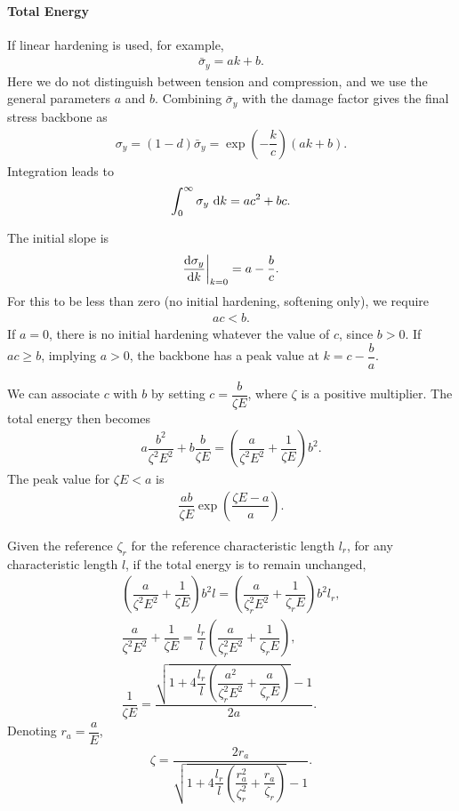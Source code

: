 \paragraph{Total Energy}
If linear hardening is used, for example,
\begin{gather}
\bar{\sigma}_y=ak+b.
\end{gather}
Here we do not distinguish between tension and compression, and we use the general parameters $a$ and $b$.
Combining $\bar{\sigma}_y$ with the damage factor gives the final stress backbone as
\begin{gather}
\sigma_y=\left(1-d\right)\bar{\sigma}_y=\exp\left(-\dfrac{k}{c}\right)\left(ak+b\right).
\end{gather}
Integration leads to
\begin{gather}
\int_{0}^{\infty}\sigma_y~\mathrm{d}k=ac^2+bc.
\end{gather}

The initial slope is
\begin{gather}
\dfrac{\mathrm{d}\sigma_y}{\mathrm{d}k}\bigg|_{k=0}=a-\dfrac{b}{c}.
\end{gather}
For this to be less than zero (no initial hardening, softening only), we require
\begin{gather}
ac<b.
\end{gather}
If $a=0$, there is no initial hardening whatever the value of $c$, since $b>0$.
If $ac\geqslant{}b$, implying $a>0$, the backbone has a peak value at $k=c-\dfrac{b}{a}$.

We can associate $c$ with $b$ by setting $c=\dfrac{b}{\zeta{}E}$, where $\zeta$ is a positive multiplier.
The total energy then becomes
\begin{gather}
a\dfrac{b^2}{\zeta^2E^2}+b\dfrac{b}{\zeta{}E}=\left(\dfrac{a}{\zeta^2E^2}+\dfrac{1}{\zeta{}E}\right)b^2.
\end{gather}
The peak value for $\zeta{}E<a$ is
\begin{gather}
\dfrac{ab}{\zeta{}E}\exp\left(\dfrac{\zeta{}E-a}{a}\right).
\end{gather}

Given the reference $\zeta_r$ for the reference characteristic length $l_r$, for any characteristic length $l$, if the total energy is to remain unchanged,
\begin{gather}
\left(\dfrac{a}{\zeta^2E^2}+\dfrac{1}{\zeta{}E}\right)b^2l=\left(\dfrac{a}{\zeta_r^2E^2}+\dfrac{1}{\zeta_r{}E}\right)b^2l_r,\\
\dfrac{a}{\zeta^2E^2}+\dfrac{1}{\zeta{}E}=\dfrac{l_r}{l}\left(\dfrac{a}{\zeta_r^2E^2}+\dfrac{1}{\zeta_r{}E}\right),\\
\dfrac{1}{\zeta{}E}=\dfrac{\sqrt{1+4\dfrac{l_r}{l}\left(\dfrac{a^2}{\zeta_r^2E^2}+\dfrac{a}{\zeta_r{}E}\right)}-1}{2a}.
\end{gather}
Denoting $r_a=\dfrac{a}{E}$,
\begin{gather}
\zeta=\dfrac{2r_a}{\sqrt{1+4\dfrac{l_r}{l}\left(\dfrac{r_a^2}{\zeta_r^2}+\dfrac{r_a}{\zeta_r}\right)}-1}.
\end{gather}

